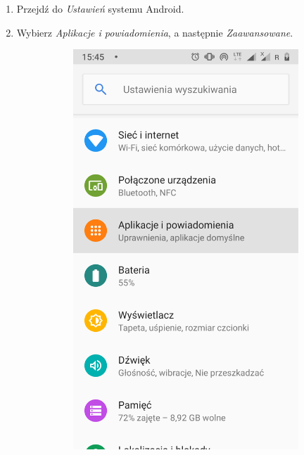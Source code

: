\begin{enumerate}
	
	\item Przejdź do \textit{Ustawień} systemu Android.
	
	\item Wybierz \textit{Aplikacje i powiadomienia}, a następnie \textit{Zaawansowane}.
	
	\begin{figure}[H]
		\centering
		\begin{subfigure}{0.35\textwidth}
			\centering
			\includegraphics[scale=0.14]{dodatekA/1_1.png}

\end{subfigure}
\end{figure}
\end{enumerate}
